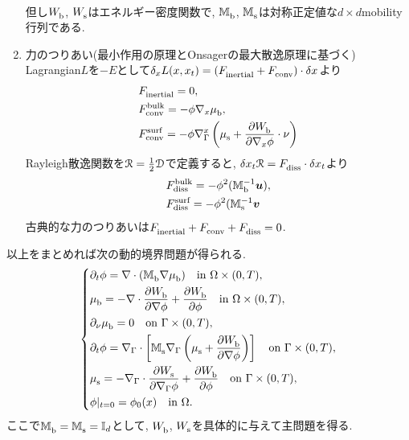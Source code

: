 \documentclass[a4paper]{jsarticle}
\begin{document}
\begin{enumerate}
\begin{align}
	\end{align}
	但し${W}^{\text{}}_{\text{b}}$, ${W}^{\text{}}_{\text{s}}$はエネルギー密度関数で,
	${\mathbb{M}}^{\text{}}_{\text{b}}$, ${\mathbb{M}}^{\text{}}_{\text{s}}$は対称正定値な$d\times d$mobility行列である.
	\item 力のつりあい(最小作用の原理とOnsagerの最大散逸原理に基づく)
	Lagrangian$L$を$-E$として$\delta_x L(x,x_t)=({F}^{\text{}}_{\text{inertial}} + {F}^{\text{}}_{\text{conv}})\cdot\delta x$より
	\begin{align}
		&{F}^{\text{}}_{\text{inertial}} = 0,\\
		&{F}^{\text{bulk}}_{\text{conv}} = -\phi\nabla_x{\mu}^{\text{}}_{\text{b}},\\
		&{F}^{\text{surf}}_{\text{conv}} = -\phi\nabla_{\Gamma}^x\left( {\mu}^{\text{}}_{\text{s}} + \frac{\partial{W}^{\text{}}_{\text{b}}}{\partial\nabla_x\phi}\cdot\nu\right)
	\end{align}
	Rayleigh散逸関数を$\mathcal{R}=\frac{1}{2}\mathcal{D}$で定義すると, $\delta{x_t}\mathcal{R} = {F}^{\text{}}_{\text{diss}}\cdot\delta x_t$より
	\begin{align}
		&{F}^{\text{bulk}}_{\text{diss}} = -\phi^2({\mathbb{M}}^{\text{$-1$}}_{\text{b}}\bm{u}),\\
		&{F}^{\text{surf}}_{\text{diss}} = -\phi^2({\mathbb{M}}^{\text{$-1$}}_{\text{s}}\bm{v}
	\end{align}
	古典的な力のつりあいは${F}^{\text{}}_{\text{inertial}} + {F}^{\text{}}_{\text{conv}} + {F}^{\text{}}_{\text{diss}} = 0$.
\end{enumerate}

以上をまとめれば次の動的境界問題が得られる.
\begin{equation}\left\{\begin{aligned}
	&\partial_t\phi = \nabla\cdot({\mathbb{M}}^{\text{}}_{\text{b}}\nabla{\mu}^{\text{}}_{\text{b}}) \quad\text{in }\Omega\times(0,T),\\
	&{\mu}^{\text{}}_{\text{b}} = -\nabla\cdot\frac{\partial{W}^{\text{}}_{\text{b}}}{\partial\nabla\phi} + \frac{\partial{W}^{\text{}}_{\text{b}}}{\partial\phi} \quad\text{in }\Omega\times(0,T),\\
	&\partial_{\nu}{\mu}^{\text{}}_{\text{b}} = 0 \quad\text{on }\Gamma\times(0,T),\\
	&\partial_t\phi = \nabla_{\Gamma}\cdot\left[ {\mathbb{M}}^{\text{}}_{\text{s}}\nabla_{\Gamma}\left({\mu}^{\text{}}_{\text{s}} + \frac{\partial{W}^{\text{}}_{\text{b}}}{\partial\nabla\phi}\right) \right] \quad\text{on }\Gamma\times(0,T),\\
	&{\mu}^{\text{}}_{\text{s}} = -\nabla_{\Gamma}\cdot\frac{\partial{W}^{\text{}}_{\text{s}}}{\partial\nabla_{\Gamma}\phi} + \frac{\partial{W}^{\text{}}_{\text{b}}}{\partial\phi} \quad\text{on }\Gamma\times(0,T),\\
	&\phi|_{t=0} = \phi_0(x) \quad\text{in }\Omega.
\end{aligned}\right.\end{equation}
ここで${\mathbb{M}}^{\text{}}_{\text{b}}={\mathbb{M}}^{\text{}}_{\text{s}}=\mathbb{I}_d$として, ${W}^{\text{}}_{\text{b}}$, ${W}^{\text{}}_{\text{s}}$を具体的に与えて主問題を得る.
\end{document}

